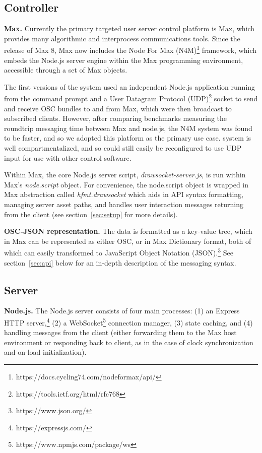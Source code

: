 \subsection{Controller}
\noindent
\textbf{Max.}
Currently the primary targeted user server control platform is Max, which provides many algorithmic and interprocess communications tools. 
Since the release of Max 8, Max now includes the Node For Max (N4M)\footnote{https://docs.cycling74.com/nodeformax/api/} framework, which embeds the Node.js server engine within the Max programming environment, accessible through a set of Max objects.

The first versions of the \drawsocket system used an independent Node.js application running from the command prompt and a User Datagram Protocol (UDP)\footnote{https://tools.ietf.org/html/rfc768} socket to send and receive OSC bundles to and from Max, which were then broadcast to subscribed clients.
However, after comparing benchmarks measuring the roundtrip messaging time between Max and node.js, the N4M system was found to be faster, and so we adopted this platform as the primary use case.
\drawsocket system is well compartmentalized, and so could still easily be reconfigured to use UDP input for use with other control software.

Within Max, the core Node.js server script, \textit{drawsocket-server.js}, is run within Max's \textit{node.script} object. 
For convenience, the node.script object is wrapped in Max abstraction called \textit{hfmt.drawsocket} which aids in API syntax formatting, managing server asset paths, and handles user interaction messages returning from the client (see section~\ref{sec:setup} for more details).

\medskip
\noindent
\textbf{OSC-JSON representation.}
The \drawsocket data is formatted as a key-value tree, which in Max can be represented as either OSC, or in Max Dictionary format,
both of which can easily transformed to JavaScript Object Notation (JSON).\footnote{https://www.json.org/} See section~\ref{sec:api} below for an in-depth description of the \drawsocket messaging syntax.

\subsection{Server}
\noindent
\textbf{Node.js.}
The Node.js server consists of four main processes: (1) an Express HTTP server,\footnote{https://expressjs.com/} (2) a WebSocket\footnote{https://www.npmjs.com/package/ws} connection manager, (3) state caching, and (4) handling messages from the client (either forwarding them to the Max host environment or responding back to client,  as in the case of clock synchronization and on-load initialization).

